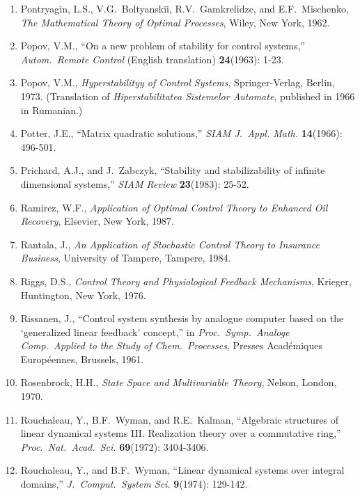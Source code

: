 \begin{enumerate}
\item
Pontryagin, L.S., V.G.\ Boltyanskii, R.V.\ Gamkrelidze, and E.F.\ Mischenko,
{\it The Mathematical Theory of Optimal Processes}, Wiley, New York, 1962.

\item
Popov, V.M., ``On a new problem of stability for control systems,'' {\it
Autom.\ Remote Control} (English translation) {\bf 24}(1963): 1-23.

\item
Popov, V.M., {\it Hyperstabilityy of Control Systems}, Springer-Verlag,
Berlin, 1973. (Translation of {\it Hiperstabilitatea Sistemelor Automate},
published in 1966 in Rumanian.)

\item
Potter, J.E., ``Matrix quadratic solutions,'' {\it SIAM J.\ Appl.  Math.} {\bf
14}(1966): 496-501.

\item
Prichard, A.J., and J.\ Zabczyk, ``Stability and stabilizability of infinite
dimensional systems,'' {\it SIAM Review} {\bf 23}(1983): 25-52.

\item
Ramirez, W.F., {\it Application of Optimal Control Theory to Enhanced Oil
Recovery}, Elsevier, New York, 1987.

\item
Rantala, J., {\it An Application of Stochastic Control Theory to Insurance
Business}, University of Tampere, Tampere, 1984.

\item
Riggs, D.S., {\it Control Theory and Physiological Feedback Mechanisms},
Krieger, Huntington, New York, 1976.

\item
Rissanen, J., ``Control system synthesis by analogue computer based on the
`generalized linear feedback' concept,'' in {\it Proc.\ Symp.\ Analoge Comp.\
Applied to the Study of Chem.\ Processes}, Presses Acad\'emiques
Europ\'eennes, Brussels, 1961.

\item
Rosenbrock, H.H., {\it State Space and Multivariable Theory}, Nelson, London,
1970.

\item
Rouchaleau, Y., B.F.\ Wyman, and R.E.\ Kalman, ``Algebraic structures of
linear dynamical systems III.  Realization theory over a commutative ring,''
{\it Proc.\ Nat.\ Acad.\ Sci.} {\bf 69}(1972): 3404-3406.

\item
Rouchaleau, Y., and B.F.\ Wyman, ``Linear dynamical systems over integral
domains,'' {\it J.\ Comput.\ System Sci.} {\bf 9}(1974): 129-142.


\end{enumerate}
